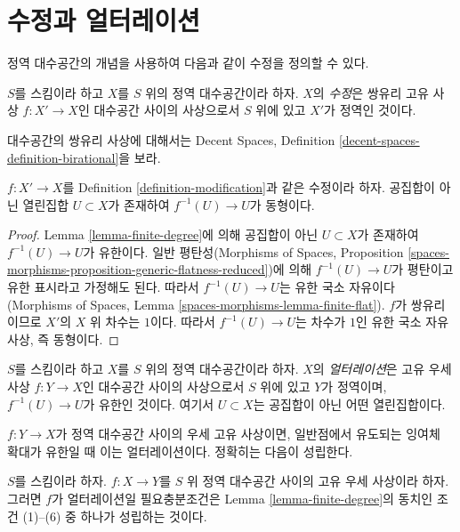 \section{수정과 얼터레이션}
\label{section-modifications-alterations}

\noindent
정역 대수공간의 개념을 사용하여 다음과 같이 수정을 정의할 수 있다.

\begin{definition}
\label{definition-modification}
$S$를 스킴이라 하고 $X$를 $S$ 위의 정역 대수공간이라 하자. $X$의
{\it 수정}은 쌍유리 고유 사상 $f : X' \to X$인 대수공간 사이의
사상으로서 $S$ 위에 있고 $X'$가 정역인 것이다.
\end{definition}

\noindent
대수공간의 쌍유리 사상에 대해서는 Decent Spaces, Definition
\ref{decent-spaces-definition-birational}을 보라.

\begin{lemma}
\label{lemma-modification-iso-over-open}
$f : X' \to X$를 Definition \ref{definition-modification}과 같은
수정이라 하자. 공집합이 아닌 열린집합 $U \subset X$가 존재하여
$f^{-1}(U) \to U$가 동형이다.
\end{lemma}

\begin{proof}
Lemma \ref{lemma-finite-degree}에 의해 공집합이 아닌 $U \subset X$가
존재하여 $f^{-1}(U) \to U$가 유한이다. 일반 평탄성(Morphisms of
Spaces, Proposition
\ref{spaces-morphisms-proposition-generic-flatness-reduced})에 의해
$f^{-1}(U) \to U$가 평탄이고 유한 표시라고 가정해도 된다. 따라서
$f^{-1}(U) \to U$는 유한 국소 자유이다(Morphisms of Spaces, Lemma
\ref{spaces-morphisms-lemma-finite-flat}). $f$가 쌍유리이므로 $X'$의
$X$ 위 차수는 $1$이다. 따라서 $f^{-1}(U) \to U$는 차수가 $1$인 유한
국소 자유 사상, 즉 동형이다.
\end{proof}

\begin{definition}
\label{definition-alteration}
$S$를 스킴이라 하고 $X$를 $S$ 위의 정역 대수공간이라 하자. $X$의
{\it 얼터레이션}은 고유 우세 사상 $f : Y \to X$인 대수공간 사이의
사상으로서 $S$ 위에 있고 $Y$가 정역이며, $f^{-1}(U) \to U$가
유한인 것이다. 여기서 $U \subset X$는 공집합이 아닌 어떤 열린집합이다.
\end{definition}

\noindent
$f : Y \to X$가 정역 대수공간 사이의 우세 고유 사상이면, 일반점에서
유도되는 잉여체 확대가 유한일 때 이는 얼터레이션이다. 정확히는 다음이
성립한다.

\begin{lemma}
\label{lemma-alteration-generically-finite}
$S$를 스킴이라 하자. $f : X \to Y$를 $S$ 위 정역 대수공간 사이의
고유 우세 사상이라 하자. 그러면 $f$가 얼터레이션일 필요충분조건은
Lemma \ref{lemma-finite-degree}의 동치인 조건 (1)--(6) 중 하나가
성립하는 것이다.
\end{lemma}


